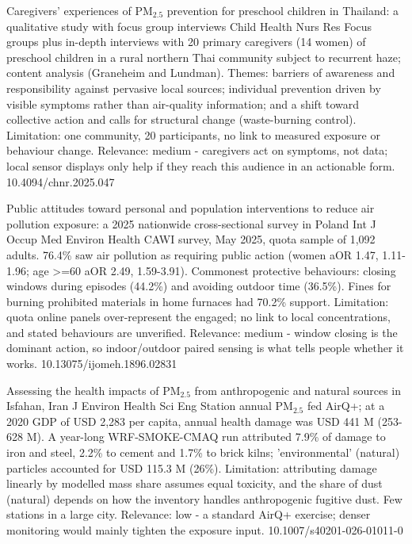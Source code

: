 \documentclass[10pt]{article}
\begin{document}
{Caregivers' experiences of PM$_{2.5}$ prevention for preschool children in Thailand: a qualitative study with focus group interviews}
{Child Health Nurs Res}
{Focus groups plus in-depth interviews with 20 primary caregivers (14 women) of preschool children in a rural northern Thai community subject to recurrent haze; content analysis (Graneheim and Lundman). Themes: barriers of awareness and responsibility against pervasive local sources; individual prevention driven by visible symptoms rather than air-quality information; and a shift toward collective action and calls for structural change (waste-burning control). Limitation: one community, 20 participants, no link to measured exposure or behaviour change. Relevance: medium - caregivers act on symptoms, not data; local sensor displays only help if they reach this audience in an actionable form.}
{10.4094/chnr.2025.047}

{Public attitudes toward personal and population interventions to reduce air pollution exposure: a 2025 nationwide cross-sectional survey in Poland}
{Int J Occup Med Environ Health}
{CAWI survey, May 2025, quota sample of 1,092 adults. 76.4\% saw air pollution as requiring public action (women aOR 1.47, 1.11-1.96; age >=60 aOR 2.49, 1.59-3.91). Commonest protective behaviours: closing windows during episodes (44.2\%) and avoiding outdoor time (36.5\%). Fines for burning prohibited materials in home furnaces had 70.2\% support. Limitation: quota online panels over-represent the engaged; no link to local concentrations, and stated behaviours are unverified. Relevance: medium - window closing is the dominant action, so indoor/outdoor paired sensing is what tells people whether it works.}
{10.13075/ijomeh.1896.02831}

{Assessing the health impacts of PM$_{2.5}$ from anthropogenic and natural sources in Isfahan, Iran}
{J Environ Health Sci Eng}
{Station annual PM$_{2.5}$ fed AirQ+; at a 2020 GDP of USD 2,283 per capita, annual health damage was USD 441 M (253-628 M). A year-long WRF-SMOKE-CMAQ run attributed 7.9\% of damage to iron and steel, 2.2\% to cement and 1.7\% to brick kilns; 'environmental' (natural) particles accounted for USD 115.3 M (26\%). Limitation: attributing damage linearly by modelled mass share assumes equal toxicity, and the share of dust (natural) depends on how the inventory handles anthropogenic fugitive dust. Few stations in a large city. Relevance: low - a standard AirQ+ exercise; denser monitoring would mainly tighten the exposure input.}
{10.1007/s40201-026-01011-0}
\end{document}
